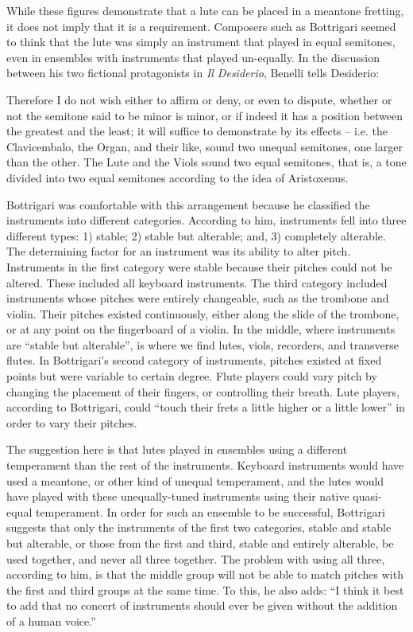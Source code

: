 While these figures demonstrate that a lute can be placed in a meantone fretting,
it does not imply that it is a requirement. Composers such as Bottrigari seemed 
to think that the lute was simply an instrument that played in
equal semitones, even in ensembles with instruments that played un-equally.
In the discussion between his two fictional protagonists in \textit{Il Desiderio}, 
Benelli tells Desiderio:

\begin{blocks}
Therefore I do not wish either to affirm or deny, or even to dispute, whether or not 
the semitone said to be minor is minor, or if indeed it has a position between the 
greatest and the least; it will suffice to demonstrate by its effects -- i.e. the
Clavicembalo, the Organ, and their like, sound two unequal semitones, one larger 
than the other. The Lute and the Viols sound two equal semitones, that is, a tone
divided into two equal semitones according to the idea of Aristoxenus. \autocite[17]{HB:1}
\end{blocks}

Bottrigari was comfortable with this arrangement because he classified the instruments into different categories.
According to him, instruments fell into three different types: 1) stable; 2) stable but alterable; and, 3) completely
alterable. The determining factor for an instrument was its ability to alter pitch. Instruments in the first category
were stable because their pitches could not be altered. These included all keyboard instruments. The third category
included instruments whose pitches were entirely changeable, such as the trombone and violin. Their pitches existed
continuously, either along the slide of the trombone, or at any point on the fingerboard of a violin. In the middle,
where instruments are ``stable but alterable'', is where we find lutes, viols, recorders, and transverse flutes. In
Bottrigari's second category of instruments, pitches existed at fixed points but were variable to certain degree. Flute
players could vary pitch by changing the placement of their fingers, or controlling their breath. Lute players,
according to Bottrigari, could ``touch their frets a little higher or a little lower'' in order to vary their pitches.
\autocite[15]{HB:1}

The suggestion here is that lutes played in ensembles using a different temperament than the rest of the instruments.
Keyboard instruments would have used a meantone, or other kind of unequal temperament, and the lutes would have played
with these unequally-tuned instruments using their native quasi-equal temperament. In order for such an ensemble to be
successful, Bottrigari suggests that only the instruments of the first two categories, stable and stable but alterable,
or those from the first and third, stable and entirely alterable, be used together, and never all three together. The
problem with using all three, according to him, is that the middle group will not be able to match pitches with the
first and third groups at the same time. To this, he also adds: ``I think it best to add that no concert of instruments
should ever be given without the addition of a human voice.'' \autocite[23]{HB:1}


